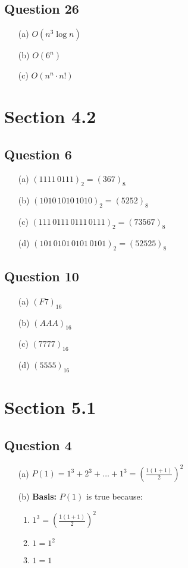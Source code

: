 \documentclass{article}
\begin{document}
\subsection*{Question 26}
\begin{itemize}
    \item[(a)] $O(n^3 \log n)$
    \item[(b)] $O(6^n)$
    \item[(c)] $O(n^n \cdot n!)$
\end{itemize}

\section*{Section 4.2}
\subsection*{Question 6}
\begin{itemize}
    \item[(a)] $(1111 \, 0111)_2 = (367)_8$
    \item[(b)] $(1010 \, 1010 \, 1010)_2 = (5252)_8$
    \item[(c)] $(111 \, 0111 \, 0111 \, 0111)_2 = (73567)_8$
    \item[(d)] $(101 \, 0101 \, 0101 \, 0101)_2 = (52525)_8$
\end{itemize}

\subsection*{Question 10}
\begin{itemize}
    \item[(a)] $(F7)_{16}$
    \item[(b)] $(AAA)_{16}$
    \item[(c)] $(7777)_{16}$
    \item[(d)] $(5555)_{16}$
\end{itemize}

\section*{Section 5.1}

\subsection*{Question 4}
\begin{itemize}
    \item[(a)] \( P(1) = 1^3 + 2^3 + \dots + 1^3 = \left( \frac{1(1 + 1)}{2} \right)^2 \)
    \item[(b)] \textbf{Basis:} \( P(1) \) is true because:
    \begin{enumerate}
        \item \( 1^3 = \left( \frac{1(1 + 1)}{2} \right)^2 \)
        \item \( 1 = 1^2 \)
        \item \( 1 = 1 \)
    \end{enumerate}
\end{itemize}
\end{document}
